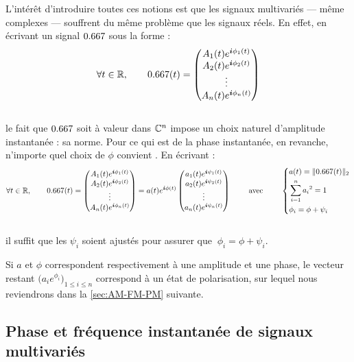 L'intérêt d'introduire toutes ces notions est que les signaux multivariés --- même complexes --- souffrent du même problème que les signaux réels. 
En effet, en écrivant un signal $\x$ sous la forme :
\[\forall t\in\R,\qquad 
\x(t) = \begin{pmatrix} A_1(t)e^{\i \phi_1(t)} \\ A_2(t)e^{\i \phi_2(t)} \\ \vdots \\ A_n(t)e^{\i \phi_n(t)}
\end{pmatrix}\]
\\
le fait que $\x$ soit à valeur dans $\mathbb{C}^n$ impose un choix naturel d'amplitude instantanée : sa norme. Pour ce qui est de la phase instantanée, en revanche, n'importe quel choix de $\phi$ convient \apriori. En écrivant :
\[\forall t\in\R,\qquad 
\x(t) = \begin{pmatrix} A_1(t)e^{\i \phi_1(t)} \\ A_2(t)e^{\i \phi_2(t)} \\ \vdots \\ A_n(t)e^{\i \phi_n(t)} \end{pmatrix}
= a(t)e^{\i \phi(t)}\begin{pmatrix} a_1(t)e^{\i \psi_1(t)} \\ a_2(t)e^{\i \psi_2(t)} \\ \vdots \\ a_n(t)e^{\i \psi_n(t)} \end{pmatrix}
\qquad\text{ avec }\qquad 
\left\{ \begin{aligned}
	& a(t) = \| \x(t) \|_2 \\
	& \sum_{i=1}^n {a_i}^2 = 1 \\
	& \phi_i = \phi + \psi_i \end{aligned}\right.\]
\\
il suffit que les $\psi_i$ soient ajustés pour assurer que $\ \phi_i = \phi + \psi_i$.
\\
\begin{remarque}
	Si $a$ et $\phi$ correspondent respectivement à une amplitude et une phase, le vecteur restant $\big( a_ie^{\phi_i} \big)_{1\leq i\leq n}$ correspond à un état de polarisation, sur lequel nous reviendrons dans la \cref{sec:AM-FM-PM} suivante.
\end{remarque}
\skipl




\subsection{Phase et fréquence instantanée de signaux multivariés} \label{subsec:intro_phased}

